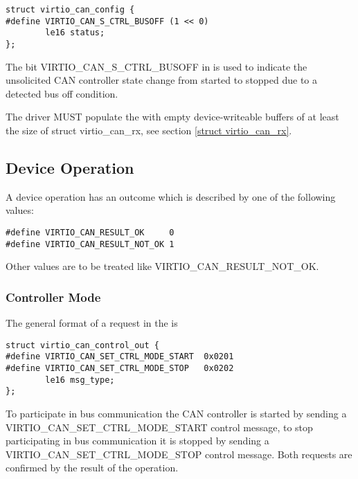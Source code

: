 \begin{lstlisting}
struct virtio_can_config {
#define VIRTIO_CAN_S_CTRL_BUSOFF (1 << 0)
        le16 status;
};
\end{lstlisting}

The bit VIRTIO_CAN_S_CTRL_BUSOFF in  is used to indicate
the unsolicited CAN controller state change from started to stopped due
to a detected bus off condition.


The driver MUST populate the  with empty device-writeable
buffers of at least the size of struct virtio_can_rx, see section
\ref{struct virtio_can_rx}.

\subsection{Device Operation}\label{sec:Device Types / CAN Device / Device Operation}

A device operation has an outcome which is described by one of the
following values:

\begin{lstlisting}
#define VIRTIO_CAN_RESULT_OK     0
#define VIRTIO_CAN_RESULT_NOT_OK 1
\end{lstlisting}

Other values are to be treated like VIRTIO_CAN_RESULT_NOT_OK.

\subsubsection{Controller Mode}\label{sec:Device Types / CAN Device / Device Operation / Controller Mode}

The general format of a request in the  is

\begin{lstlisting}
struct virtio_can_control_out {
#define VIRTIO_CAN_SET_CTRL_MODE_START  0x0201
#define VIRTIO_CAN_SET_CTRL_MODE_STOP   0x0202
        le16 msg_type; 
};
\end{lstlisting}

To participate in bus communication the CAN controller is started by
sending a VIRTIO_CAN_SET_CTRL_MODE_START control message, to stop
participating in bus communication it is stopped by sending a
VIRTIO_CAN_SET_CTRL_MODE_STOP control message. Both requests are
confirmed by the result of the operation.

